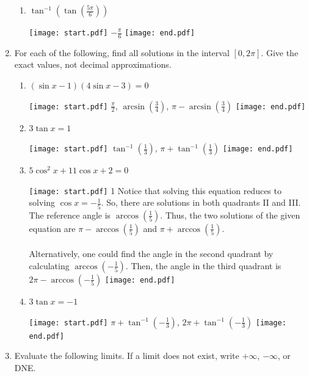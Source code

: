 \documentclass[12pt]{article}
\begin{document}
\begin{enumerate}
\begin{enumerate}
\item $\displaystyle \tan^{-1}{\left(\tan{\left(\frac{5\pi}{6}\right)}\right)}$

\texttt{[image: start.pdf]}
{$\displaystyle -\frac{\pi}{6}$}
\texttt{[image: end.pdf]}


\end{enumerate}

\item For each of the following, find all solutions in the interval $[0,2\pi]$.  Give the exact values, not decimal approximations.

\begin{enumerate}

\item $(\sin{x}-1)(4\sin{x}-3) = 0$

\texttt{[image: start.pdf]}
{$\frac{\pi}{2}$, $\arcsin\left(\frac{3}{4}\right)$, $\pi-\arcsin\left(\frac{3}{4}\right)$}
\texttt{[image: end.pdf]}


\item $3\tan{x}=1$

\texttt{[image: start.pdf]}
{$\tan^{-1}\left(\frac{1}{3}\right)$, $\pi+\tan^{-1}\left(\frac{1}{3}\right)$}
\texttt{[image: end.pdf]}


\item $5\cos^2{x}+11\cos{x}+2=0$

\texttt{[image: start.pdf]}
{{1\linewidth}{
Notice that solving this equation reduces to solving $\cos{x}=-\frac{1}{5}$.  So, there are solutions in both quadrants II and III.  The reference angle is $\arccos\left(\frac{1}{5}\right)$.  Thus, the two solutions of the given equation are $\pi - \arccos\left(\frac{1}{5}\right)$ and $\pi + \arccos\left(\frac{1}{5}\right)$.\\
\\
Alternatively, one could find the angle in the second quadrant by calculating $\arccos\left(-\frac{1}{5}\right)$.  Then, the angle in the third quadrant is $2\pi-\arccos\left(-\frac{1}{5}\right)$}}
\texttt{[image: end.pdf]}


\item $3\tan{x}=-1$

\texttt{[image: start.pdf]}
{$\pi+\tan^{-1}\left(-\frac{1}{3}\right)$, $2\pi+\tan^{-1}\left(-\frac{1}{3}\right)$}
\texttt{[image: end.pdf]}


\end{enumerate}

\item Evaluate the following limits.  If a limit does not exist, write $+\infty$, $-\infty$, or DNE.


\end{enumerate}
\end{document}
